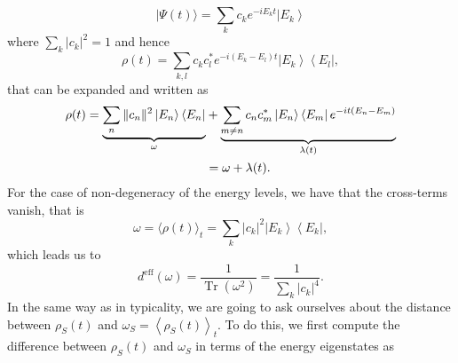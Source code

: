 \begin{equation}
|\Psi(t)\rangle=\sum_{k} c_{k} e^{-i E_{k} t}\left|E_{k}\right\rangle
\label{CH1:expansion_1}
\end{equation}
where $\sum_{k}\left|c_{k}\right|^{2}=1$ and hence
\begin{equation}
\rho(t)=\sum_{k, l} c_{k} c_{l}^{*} e^{-i\left(E_{k}-E_{l}\right) t}\left|E_{k}\right\rangle\left\langle E_{l}\right|,
\label{CH1:expansion_2}
\end{equation}
that can be expanded and written as
\begin{equation}
\begin{aligned}
\rho(t)=\underbrace{\sum_{n}\|c_{n}\|^{2}\mathinner{|{E_{n}}\rangle}\mathinner{\langle{E_{n}}|}}_{\omega}&+\underbrace{\sum_{m \neq n} c_{n} c_{m}^{*}\mathinner{|{E_{n}}\rangle}\mathinner{\langle{E_{m}}|} e^{-i t\left(E_{n}-E_{m}\right)}}_{\lambda (t)} \\
&=\omega+\lambda(t).
\end{aligned}
\label{CH1:Expansion_to_use_after}
\end{equation}
For the case of non-degeneracy of the energy levels, we have that the cross-terms vanish, that is
\begin{equation}
\omega=\langle\rho(t)\rangle_{t}=\sum_{k}\left|c_{k}\right|^{2}\left|E_{k}\right\rangle\left\langle E_{k}\right|,
\label{CH1:expansion_3}
\end{equation}
which leads us to 
\begin{equation}
d^{\mathrm{eff}}(\omega)=\frac{1}{\operatorname{Tr}\left(\omega^{2}\right)}=\frac{1}{\sum_{k}\left|c_{k}\right|^{4}}.
\label{CH1:expansion_4}
\end{equation}
In the same way as in typicality, we are going to ask ourselves about the distance between $\rho_{S}(t)$ and $\omega_{S}=\left\langle\rho_{S}(t)\right\rangle_{t}$. To do this, we first compute the difference between $\rho_S(t)$ and $\omega_{S}$ in terms of the energy eigenstates as
